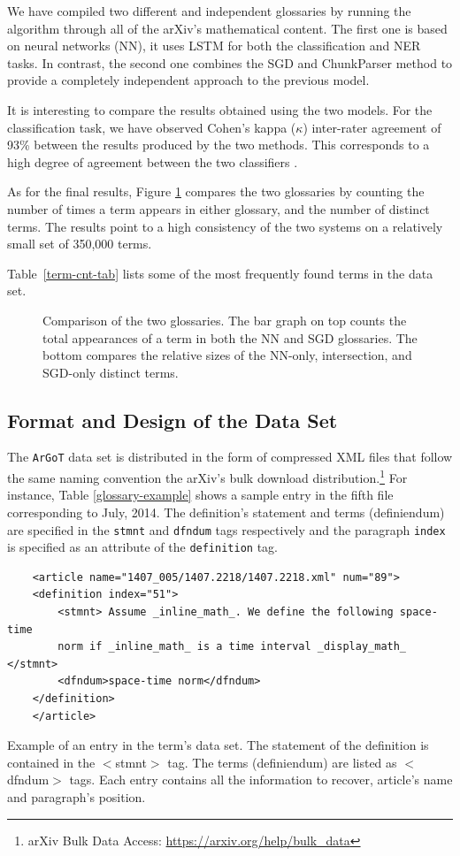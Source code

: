 \documentclass[submission,copyright,creativecommons]{eptcs}
\newcommand{\argot}{\texttt{ArGoT}\xspace}
\begin{document}
We have compiled two different and independent glossaries by running the 
algorithm through all of the arXiv's mathematical content. 
The first one  is based on neural networks (NN), it uses  LSTM for both the classification and NER tasks. 
In contrast, the second one combines the SGD and ChunkParser method to provide a completely independent approach to the previous model.

It is interesting to compare the results obtained using the two models. For the classification task, we have observed Cohen's kappa ($\kappa$) inter-rater agreement of 93\% between the results produced by the two methods.
This corresponds to a high degree of agreement between the two classifiers \cite{cohenkappa}.

As for the final results, Figure \ref{sizes} compares the two glossaries by counting the number of times a term appears in either glossary, and the number of distinct terms.
The results point to a high consistency of the two systems on a relatively small set of 350,000 terms.

Table~\ref{term-cnt-tab} lists some of the most frequently found terms in the
data set. 
\begin{figure}
    \centering
    
    \caption{\label{sizes} Comparison of the two glossaries. The bar graph on top counts the total appearances of a term in both the NN and SGD glossaries. The bottom compares the relative sizes of the NN-only, intersection, and SGD-only distinct terms.}
\end{figure}

\subsection{Format and Design of the Data Set}
The \argot data set is distributed in the form of compressed
XML
files that follow the same naming convention the arXiv's bulk download
distribution.\footnote{arXiv Bulk Data Access: \url{https://arxiv.org/help/bulk\_data}}
For instance, Table \ref{glossary-example} shows a sample entry
in the fifth file corresponding to July, 2014. The definition's
statement and terms (definiendum) are specified in the \texttt{stmnt} and
\texttt{dfndum} tags respectively and the paragraph \texttt{index} is
specified as an attribute of the \texttt{definition} tag.

\begin{table}[h]
    \centering
    \begin{verbatim}
    <article name="1407_005/1407.2218/1407.2218.xml" num="89">
    <definition index="51">
        <stmnt> Assume _inline_math_. We define the following space-time 
        norm if _inline_math_ is a time interval _display_math_ </stmnt>
        <dfndum>space-time norm</dfndum>
    </definition>
    </article>
\end{verbatim}
\caption{\label{glossary-example} Example of an entry in the term's data set. The statement of the definition is contained in the $<$stmnt$>$ tag. The terms (definiendum) are listed as $<$dfndum$>$ tags. Each entry contains all the information to recover, article's name and paragraph's position.}
\end{table}
\end{document}

